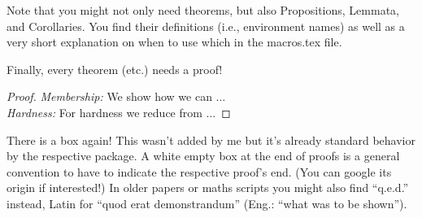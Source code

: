 Note that you might not only need theorems, but also Propositions, Lemmata, and Corollaries. You find their definitions (i.e., environment names) as well as a very short explanation on when to use which in the macros.tex file.
  
Finally, every theorem (etc.) needs a proof!
  
\begin{proof}%
  \emph{Membership:} We show how we can $\dots$\\
  \emph{Hardness:} For hardness we reduce from $\dots$
\end{proof}
  
There is a box again! This wasn't added by me but it's already standard behavior by the respective package. A white empty box at the end of proofs is a general convention to have to indicate the respective proof's end. (You can google its origin if interested!) In older papers or maths scripts you might also find ``q.e.d.'' instead, Latin for ``quod erat demonstrandum'' (Eng.: ``what was to be shown'').